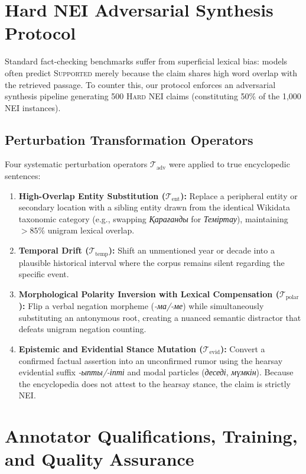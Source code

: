 \section{Hard NEI Adversarial Synthesis Protocol}
\label{sec:app_fever_hard_nei_protocol}

Standard fact-checking benchmarks suffer from superficial lexical bias: models often predict \textsc{Supported} merely because the claim shares high word overlap with the retrieved passage. To counter this, our protocol enforces an adversarial synthesis pipeline generating 500 \textsc{Hard NEI} claims (constituting 50\% of the 1,000 NEI instances).

\subsection{Perturbation Transformation Operators}
Four systematic perturbation operators $\mathcal{T}_{\text{adv}}$ were applied to true encyclopedic sentences:
\begin{enumerate}
    \item \textbf{High-Overlap Entity Substitution ($\mathcal{T}_{\text{ent}}$):} Replace a peripheral entity or secondary location with a sibling entity drawn from the identical Wikidata taxonomic category (e.g., swapping \textit{Қарағанды} for \textit{Теміртау}), maintaining $>85\%$ unigram lexical overlap.
    \item \textbf{Temporal Drift ($\mathcal{T}_{\text{temp}}$):} Shift an unmentioned year or decade into a plausible historical interval where the corpus remains silent regarding the specific event.
    \item \textbf{Morphological Polarity Inversion with Lexical Compensation ($\mathcal{T}_{\text{polar}}$):} Flip a verbal negation morpheme (\textit{-ма/-ме}) while simultaneously substituting an antonymous root, creating a nuanced semantic distractor that defeats unigram negation counting.
    \item \textbf{Epistemic and Evidential Stance Mutation ($\mathcal{T}_{\text{evid}}$):} Convert a confirmed factual assertion into an unconfirmed rumor using the hearsay evidential suffix \textit{-ыпты/-іпті} and modal particles (\textit{деседі}, \textit{мүмкін}). Because the encyclopedia does not attest to the hearsay stance, the claim is strictly \textsc{NEI}.
\end{enumerate}

\section{Annotator Qualifications, Training, and Quality Assurance}
\label{sec:app_fever_quality_assurance}

